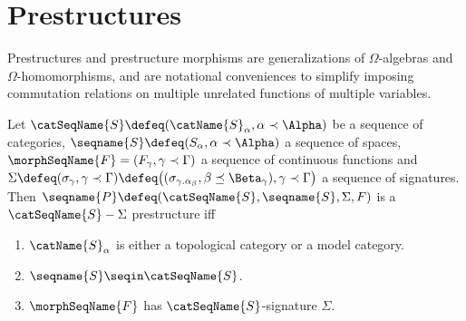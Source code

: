 \documentclass{article}
\begin{document}
\part{Prestructures}
\label{part:pre}
Prestructures and prestructure morphisms are generalizations of
$\Omega$-algebras and $\Omega$-homomorphisms, and are notational
conveniences to simplify imposing commutation relations on multiple
unrelated functions of multiple variables.

\begin{definition}[Prestructures]
\label{def:pre}
Let $\catSeqName{S} \defeq (\catName{S}_\alpha, \alpha \prec \Alpha)$ be
a sequence of categories,
$
  \seqname{S} \defeq (S_\alpha, \alpha \prec \Alpha)
$
a sequence of spaces,
$\morphSeqName{F}=(F_\gamma, \gamma \prec \Gamma)$
a sequence of continuous functions and
$
  \Sigma \defeq
  (\sigma_\gamma, \gamma \prec \Gamma) \defeq
  \bigl (
    (
      \sigma_{\gamma.{\alpha_\beta}},
      \beta \preceq \Beta_\gamma
    ),
    \gamma \prec \Gamma
  \bigr )
$
a sequence of signatures.
Then $\seqname{P} \defeq (\catSeqName{S}, \seqname{S}, \Sigma, F)$ is a
$\catSeqName{S}-\Sigma$ prestructure iff
\begin{enumerate}
\item $\catName{S}_\alpha$ is either a topological category or a model category.
\item $\seqname{S} \seqin \catSeqName{S}$.
\item $\morphSeqName{F}$ has $\catSeqName{S}$-signature $\Sigma$.
\end{enumerate}
\end{definition}
\end{document}
